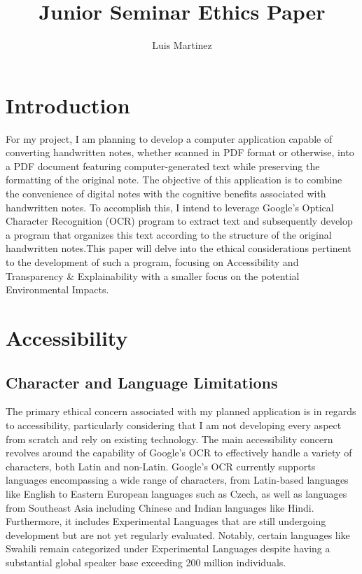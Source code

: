 \documentclass[10pt,twocolumn]{article}
\title{Junior Seminar Ethics Paper}
\author{Luis Martinez}
\affiliation{Occidental College}
\begin{document}
\maketitle

\section{Introduction}
For my project, I am planning to develop a computer application capable of converting handwritten notes, whether scanned in PDF format or otherwise, into a PDF document featuring computer-generated text while preserving the formatting of the original note. The objective of this application is to combine the convenience of digital notes with the cognitive benefits associated with handwritten notes. To accomplish this, I intend to leverage Google's Optical Character Recognition (OCR) program to extract text and subsequently develop a program that organizes this text according to the structure of the original handwritten notes.This paper will delve into the ethical considerations pertinent to the development of such a program, focusing on Accessibility and Transparency \& Explainability with a smaller focus on the potential Environmental Impacts.


\section{Accessibility }
\subsection{Character and Language Limitations}

The primary ethical concern associated with my planned application is in regards to accessibility, particularly considering that I am not developing every aspect from scratch and rely on existing technology. The main accessibility concern revolves around the capability of Google's OCR to effectively handle a variety of characters, both Latin and non-Latin. Google's OCR currently supports languages encompassing a wide range of characters, from Latin-based languages like English to Eastern European languages such as Czech, as well as languages from Southeast Asia including Chinese and Indian languages like Hindi\cite{languagesupport}. Furthermore, it includes Experimental Languages that are still undergoing development but are not yet regularly evaluated. Notably, certain languages like Swahili remain categorized under Experimental Languages despite having a substantial global speaker base exceeding 200 million individuals\cite{swahili}.
\end{document}
